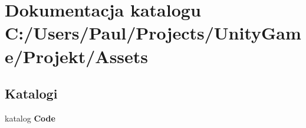 \section{Dokumentacja katalogu C\+:/\+Users/\+Paul/\+Projects/\+Unity\+Game/\+Projekt/\+Assets}
\label{dir_f35e7da0219ae850ba2146256b33883b}
\subsection*{Katalogi}
\begin{DoxyCompactItemize}
\item 
katalog {\bf Code}
\end{DoxyCompactItemize}
